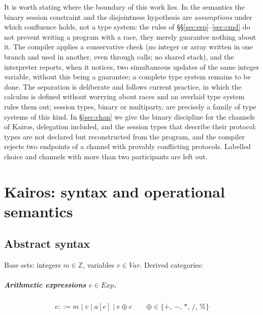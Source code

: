 \medskip
\noindent
It is worth stating where the boundary of this work lies. In the semantics the binary
session constraint and the disjointness hypothesis are \emph{assumptions} under which
confluence holds, not a type system: the rules of
\S\S\ref{sec:esp}--\ref{sec:cmd} do not prevent writing a program with
a race, they merely guarantee nothing about it. The compiler
applies a conservative check (no integer or array written in one branch
and used in another, even through calls; no shared stack), and
the interpreter reports, when it notices, two simultaneous updates of the
same integer variable, without this being a guarantee; a complete type system remains to be done. The separation is
deliberate and follows current practice, in which the calculus is defined without
worrying about races and an overlaid type system rules them out; session types,
binary or multiparty, are precisely a family of type systems
of this kind. In \S\ref{sec:chan} we give the binary discipline for the channels of
Kairos, delegation included, and the session types that describe their protocol:
types are not declared but reconstructed from the program, and the compiler
rejects two endpoints of a channel with provably conflicting protocols. Labelled choice and channels
with more than two participants are left out.

\chapter{Kairos: syntax and operational semantics}
\label{chap:semantica}

\section{Abstract syntax}
\label{sec:sintassi}

Base sets: integers $m \in \mathbb{Z}$, variables $v \in \mathit{Var}$.
Derived categories:

\paragraph{Arithmetic expressions $e \in \mathit{Exp}$.}
\begin{align*}
e ::= m \mid v \mid a[e] \mid e \oplus e
\qquad
\oplus \in \{+,\,-,\,*,\,/,\,\%\}
\end{align*}

